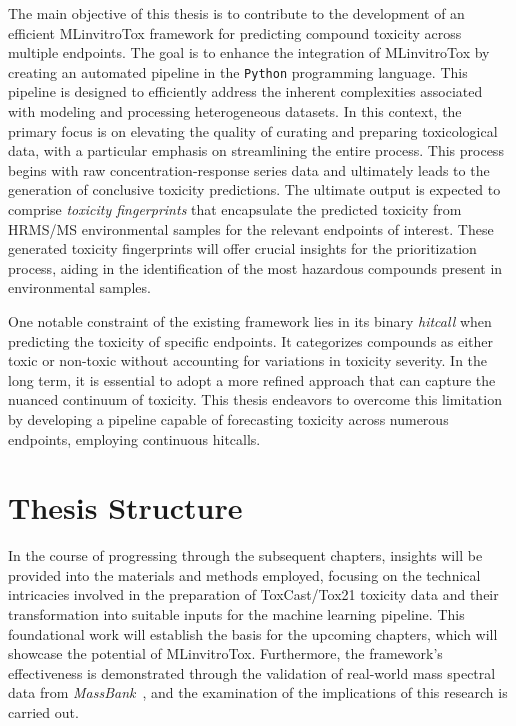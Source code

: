 The main objective of this thesis is to contribute to the development of an efficient MLinvitroTox framework for predicting compound toxicity across multiple endpoints. The goal is to enhance the integration of MLinvitroTox by creating an automated pipeline in the \texttt{Python} programming language. This pipeline is designed to efficiently address the inherent complexities associated with modeling and processing heterogeneous datasets. In this context, the primary focus is on elevating the quality of curating and preparing toxicological data, with a particular emphasis on streamlining the entire process. This process begins with raw concentration-response series data and ultimately leads to the generation of conclusive toxicity predictions. The ultimate output is expected to comprise \emph{toxicity fingerprints} that encapsulate the predicted toxicity from HRMS/MS environmental samples for the relevant endpoints of interest. These generated toxicity fingerprints will offer crucial insights for the prioritization process, aiding in the identification of the most hazardous compounds present in environmental samples.

One notable constraint of the existing framework lies in its binary \emph{hitcall} when predicting the toxicity of specific endpoints. It categorizes compounds as either toxic or non-toxic without accounting for variations in toxicity severity. In the long term, it is essential to adopt a more refined approach that can capture the nuanced continuum of toxicity. This thesis endeavors to overcome this limitation by developing a pipeline capable of forecasting toxicity across numerous endpoints, employing continuous hitcalls.



\section{Thesis Structure}

In the course of progressing through the subsequent chapters, insights will be provided into the materials and methods employed, focusing on the technical intricacies involved in the preparation of ToxCast/Tox21 toxicity data and their transformation into suitable inputs for the machine learning pipeline. This foundational work will establish the basis for the upcoming chapters, which will showcase the potential of MLinvitroTox. Furthermore, the framework's effectiveness is demonstrated through the validation of real-world mass spectral data from \emph{MassBank}~\cite{massbank}, and the examination of the implications of this research is carried out.
